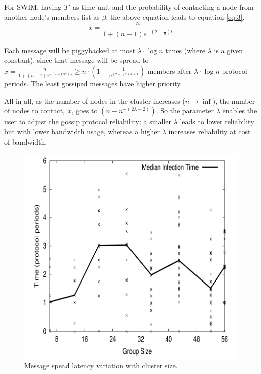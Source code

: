 For SWIM, having $T'$ as time unit and the probability of contacting a node from another node's members list as $\beta$; the above equation leads to equation \ref{eq:3}.
\begin{equation}
\label{eq:3}
   x = \frac{n}{1 + (n - 1)e^{-(2- \frac{1}{n})t}}
\end{equation}

Each message will be piggybacked at most $\lambda \cdot \log n$ times (where $\lambda$ is a given constant), since that message will be spread to $ x = \frac{n}{1 + (n - 1)e^{-(2-1/n)\lambda}} \ge n \cdot (1 - \frac{1}{n^{(2-1/n)\lambda-1}}) $ members after $\lambda \cdot \log n$ protocol periods. The least gossiped messages have higher priority.

All in all, as the number of nodes in the cluster increases ($n \rightarrow \inf$), the number of nodes to contact, $x$, goes to $(n - n^{-(2\lambda - 2)})$\cite{SWIM}. So the parameter $\lambda$ enables the user to adjust the gossip protocol reliability; a smaller $\lambda$ leads to lower reliability but with lower bandwidth usage, whereas a higher $\lambda$ increases reliability at cost of bandwidth.

\begin{figure}[h!]
		\centering
    	\includegraphics[scale=0.25]{assets/images/swim_chart.png}
    	\caption{Message spead latency variation with cluster size. \cite{SWIM}}
    	\label{image:web-milestone2}
\end{figure}

